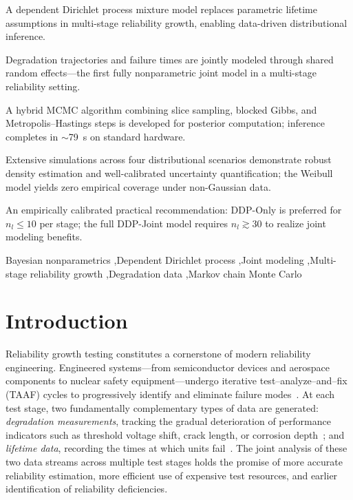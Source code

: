 \documentclass[a4paper,fleqn,longmktitle]{cas-sc}
\begin{document}
\begin{highlights}
\item A dependent Dirichlet process mixture model replaces parametric lifetime assumptions in multi-stage reliability growth, enabling data-driven distributional inference.
\item Degradation trajectories and failure times are jointly modeled through shared random effects---the first fully nonparametric joint model in a multi-stage reliability setting.
\item A hybrid MCMC algorithm combining slice sampling, blocked Gibbs, and Metropolis--Hastings steps is developed for posterior computation; inference completes in $\sim$79~s on standard hardware.
\item Extensive simulations across four distributional scenarios demonstrate robust density estimation and well-calibrated uncertainty quantification; the Weibull model yields zero empirical coverage under non-Gaussian data.
\item An empirically calibrated practical recommendation: DDP-Only is preferred for $n_l \leq 10$ per stage; the full DDP-Joint model requires $n_l \gtrsim 30$ to realize joint modeling benefits.
\end{highlights}

\begin{keywords}
Bayesian nonparametrics \sep Dependent Dirichlet process \sep Joint modeling \sep Multi-stage reliability growth \sep Degradation data \sep Markov chain Monte Carlo
\end{keywords}

\maketitle

\section{Introduction}
\label{sec:intro}

Reliability growth testing constitutes a cornerstone of modern reliability engineering. Engineered systems---from semiconductor devices and aerospace components to nuclear safety equipment---undergo iterative test--analyze--and--fix (TAAF) cycles to progressively identify and eliminate failure modes~\cite{Hall1998,Crow2004}. At each test stage, two fundamentally complementary types of data are generated: \emph{degradation measurements}, tracking the gradual deterioration of performance indicators such as threshold voltage shift, crack length, or corrosion depth~\cite{Meeker1998,Ye2015}; and \emph{lifetime data}, recording the times at which units fail~\cite{Lawless2003}. The joint analysis of these two data streams across multiple test stages holds the promise of more accurate reliability estimation, more efficient use of expensive test resources, and earlier identification of reliability deficiencies.
\end{document}

